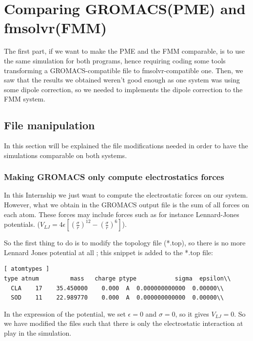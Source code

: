 \documentclass[10pt,twoside,a4paper]{report}
\begin{document}
\section{Comparing GROMACS(PME) and fmsolvr(FMM) }	

The first part, if we want to make the PME and the FMM comparable, is to use the same simulation for both programs, hence requiring coding some tools transforming a GROMACS-compatible file to fmsolvr-compatible one. Then, we saw that the results we obtained weren't good enough as one system was using some dipole correction, so we needed to implements the dipole correction to the FMM system.

\subsection{File manipulation}

In this section will be explained the file modifications needed in order to have the simulations comparable on both systems.

\subsubsection{Making GROMACS only compute electrostatics forces}

In this Internship we just want to compute the electrostatic forces on our system. However, what we obtain in the GROMACS output file is the sum of all forces on each atom. These forces may include forces such as for instance Lennard-Jones potentials.
($V_{LJ} = 4\epsilon [(\frac{\sigma}{r})^12 - (\frac{\sigma}{r})^6] $). 

So the first thing to do is to modify the topology file (*.top), so there is no more Lennard Jones potential at all ; this snippet is added to the *.top file:


\begin{verbatim}
[ atomtypes ]
type atnum         mass   charge ptype           sigma  epsilon\\
  CLA    17    35.450000    0.000  A  0.000000000000  0.00000\\
  SOD    11    22.989770    0.000  A  0.000000000000  0.00000\\

\end{verbatim}


In the expression of the potential, we set $\epsilon = 0$ and $\sigma = 0$, so it gives $V_{LJ} = 0$. So we have modified the files such that there is only the electrostatic interaction at play in the simulation.
\end{document}
